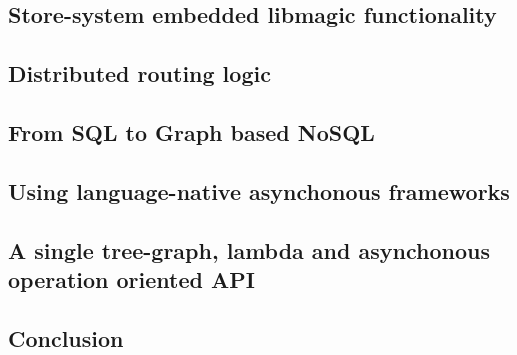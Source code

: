 \subsection{Store-system embedded libmagic functionality}
\subsection{Distributed routing logic}
\subsection{From SQL to Graph based NoSQL}
\subsection{Using language-native asynchonous frameworks}
\subsection{A single tree-graph, lambda and asynchonous operation oriented API}
\subsection{Conclusion}
